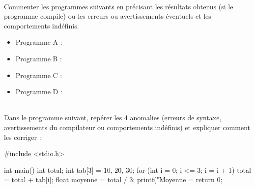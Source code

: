 \documentclass[11pt,a4paper]{article}
\begin{document}
\begin{Exercise}[title={Programmes à commenter}]\\
Commenter les programmes suivants en précisant les résultats obtenus (si le programme compile) ou les erreurs ou avertissements éventuels et les comportements indéfinis.
\begin{itemize}
	\item[\textbullet] Programme A :
	\item[\textbullet] Programme B :
	\item[\textbullet] Programme C :
	\item[\textbullet] Programme D :
\end{itemize}
\end{Exercise}

\begin{Exercise}[title={À propos de l'opérateur {\tt ++}}]
\end{Exercise}

\begin{Exercise}[title={Chasse aux bugs}]\\
Dans le programme suivant, repérer les 4 anomalies (erreurs de syntaxe, avertissements du compilateur ou comportements indéfinis) et expliquer comment les corriger :
\begin{langageC}
#include <stdio.h>

int main() {
	int total;
	int tab[3] = {10, 20, 30};
	for (int i = 0; i <= 3; i = i + 1) {
		total = total + tab[i];
	}
	float moyenne = total / 3;
	printf("Moyenne = %
	return 0;
}
\end{langageC}
\end{Exercise}
\end{document}
